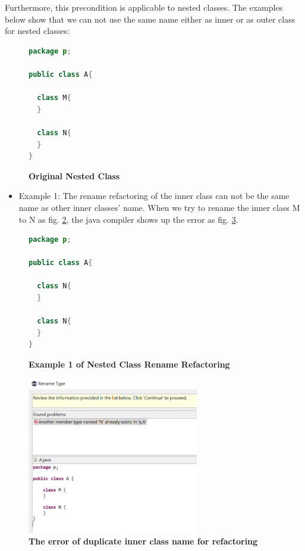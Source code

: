 Furthermore, this precondition is applicable to nested classes. The examples below show that we can not use the same name either as inner or as outer class for nested classes:

\begin{figure}[th]
\centering
\begin{minipage}[t]{0.75\linewidth}
\begin{lstlisting}[language=java, basicstyle=\scriptsize\ttfamily,frame=single]
package p;

public class A{	

  class M{
  }

  class N{
  }
} 
\end{lstlisting}
\end{minipage}
\caption{\textbf{Original Nested Class}}
\label{fig:original}
\end{figure}
\begin{itemize}
\item Example 1: The rename refactoring of the inner class can not be the same name as other inner classes' name. When we try to rename the inner class M to N as fig. \ref{fig:nestedclass1}, the java compiler shows up the error as fig. \ref{fig:NC1}.
\end{itemize}

\begin{figure}[th]
\centering
\begin{minipage}[t]{0.75\linewidth}
\begin{lstlisting}[language=java, basicstyle=\scriptsize\ttfamily,frame=single]
package p;

public class A{	
    
  class N{
  }
    
  class N{
  }
} 
\end{lstlisting}
\end{minipage}
\caption{\textbf{Example 1 of Nested Class Rename Refactoring}}
\label{fig:nestedclass1}
\end{figure}

\begin{figure}[H]
\centerline{\includegraphics[width=75mm,scale=0.4]{NC1.jpg}}
\caption{\textbf{The error of duplicate inner class name for refactoring}}
\label{fig:NC1}
\end{figure}

